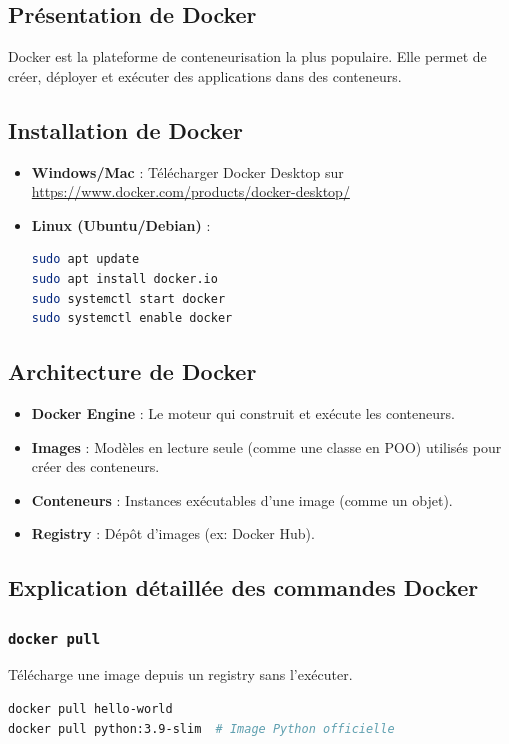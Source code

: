 \documentclass[a4paper,12pt]{article}
\begin{document}
\subsection{Présentation de Docker}
Docker est la plateforme de conteneurisation la plus populaire. Elle permet de créer, déployer et exécuter des applications dans des conteneurs.

\subsection{Installation de Docker}
\begin{itemize}
    \item \textbf{Windows/Mac} : Télécharger Docker Desktop sur \url{https://www.docker.com/products/docker-desktop/}
    \item \textbf{Linux (Ubuntu/Debian)} :
    \begin{lstlisting}[language=bash]
sudo apt update
sudo apt install docker.io
sudo systemctl start docker
sudo systemctl enable docker
    \end{lstlisting}
\end{itemize}

\subsection{Architecture de Docker}
\begin{itemize}
    \item \textbf{Docker Engine} : Le moteur qui construit et exécute les conteneurs.
    \item \textbf{Images} : Modèles en lecture seule (comme une classe en POO) utilisés pour créer des conteneurs.
    \item \textbf{Conteneurs} : Instances exécutables d'une image (comme un objet).
    \item \textbf{Registry} : Dépôt d'images (ex: Docker Hub).
\end{itemize}

\subsection{Explication détaillée des commandes Docker}

\subsubsection{\texttt{docker pull}}
Télécharge une image depuis un registry sans l'exécuter.
\begin{lstlisting}[language=bash]
docker pull hello-world
docker pull python:3.9-slim  # Image Python officielle
\end{lstlisting}
\end{document}
